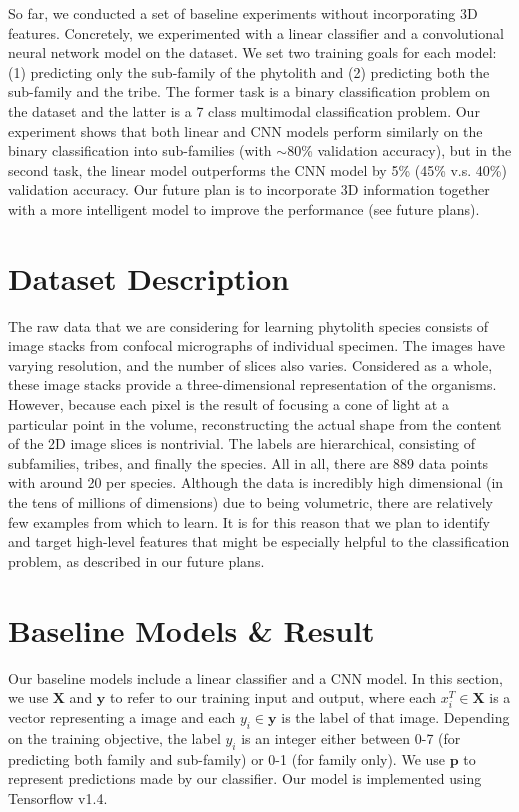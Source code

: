 \documentclass{article}
\begin{document}
So far, we conducted a set of baseline experiments without incorporating 3D features. Concretely, we experimented with a linear classifier and a convolutional neural network model on the dataset. We set two training goals for each model: (1) predicting only the sub-family of the phytolith and (2) predicting both the sub-family and the tribe. The former task is a binary classification problem on the dataset and the latter is a 7 class multimodal classification problem. Our experiment shows that both linear and CNN models perform similarly on the binary classification into sub-families (with $\sim$80\% validation accuracy), but in the second task, the linear model outperforms the CNN model by 5\% (45\% v.s. 40\%) validation accuracy. Our future plan is to incorporate 3D information together with a more intelligent model to improve the performance (see future plans).

\section{Dataset Description}

The raw data that we are considering for learning phytolith species consists of image stacks from confocal micrographs of individual specimen. The images have varying resolution, and the number of slices also varies. Considered as a whole, these image stacks provide a three-dimensional representation of the organisms. However, because each pixel is the result of focusing a cone of light at a particular point in the volume, reconstructing the actual shape from the content of the 2D image slices is nontrivial.
The labels are hierarchical, consisting of subfamilies, tribes, and finally the species. All in all, there are 889 data points with around 20 per species. Although the data is incredibly high dimensional (in the tens of millions of dimensions) due to being volumetric, there are relatively few examples from which to learn. It is for this reason that we plan to identify and target high-level features that might be especially helpful to the classification problem, as described in our future plans.


\section{Baseline Models \& Result}

Our baseline models include a linear classifier and a CNN model. In this section, we use $\mathbf{X}$ and $\mathbf{y}$ to refer to our training input and output, where each ${x}_i^T\in \mathbf{X}$ is a vector representing a image and each ${y_i}\in \mathbf{y}$ is the label of that image. Depending on the training objective, the label $y_i$ is an integer either between 0-7 (for predicting both family and sub-family) or 0-1 (for family only). We use $\mathbf{p}$ to represent predictions made by our classifier. Our model is implemented using Tensorflow v1.4.
\end{document}
